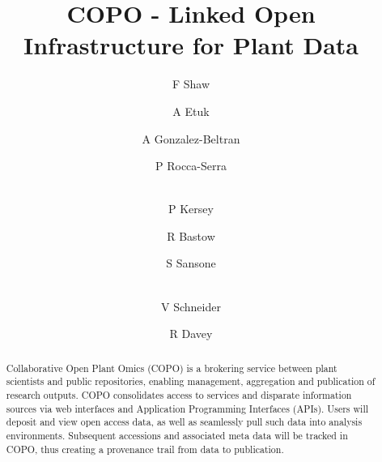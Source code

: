 \documentclass[runningheads,a4paper]{llncs}
\begin{document}
\mainmatter %

\title{COPO - Linked Open Infrastructure for Plant Data}


\author{F Shaw \and A Etuk \and A Gonzalez-Beltran\and P Rocca-Serra\and\\
  P  Kersey\and R Bastow\and S Sansone\and\\
  V Schneider\and R Davey}
%


%
%

 
\maketitle


\begin{abstract}
  Collaborative Open Plant Omics (COPO) is a brokering
  service between plant scientists and public repositories, enabling management, aggregation and publication of research
  outputs. COPO consolidates access to services and disparate
  information sources via web interfaces and Application Programming
  Interfaces (APIs). Users will deposit and view open
  access data, as well as seamlessly pull such data into analysis environments. Subsequent accessions and associated meta data will be tracked in COPO, thus creating a provenance trail from
  data to publication.
\end{abstract}

\vspace*{-0.3in}
\end{document}
